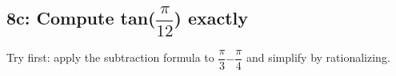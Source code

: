 \documentclass[11pt]{article}
\begin{document}
\begin{keepsection}
\begin{keepsection}
\end{keepsection}

\begin{keepsection}
\subsection{8c: Compute tan({\small\ensuremath{\dfrac{π}{12}}}) exactly}

Try first: apply the subtraction formula to {\small\ensuremath{\dfrac{π}{3}}}\ensuremath{-}{\small\ensuremath{\dfrac{π}{4}}} and simplify by rationalizing.

\end{keepsection}
\end{keepsection}
\end{document}
